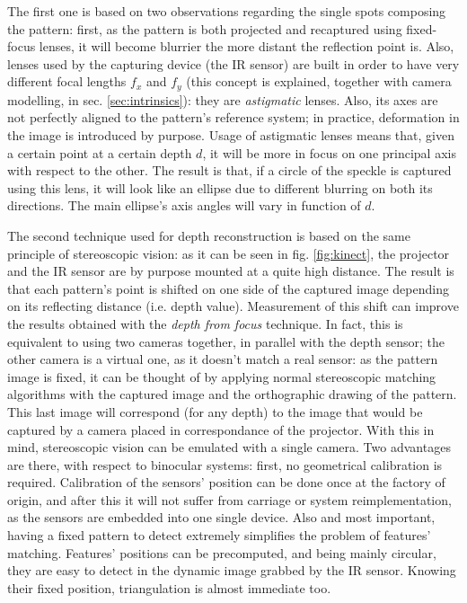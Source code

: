 The first one is based on two observations regarding the single spots
composing the pattern: first, as the pattern is both projected
and recaptured using fixed-focus lenses, it will become blurrier the more
distant the reflection point is. Also, lenses used by the capturing device (the
IR sensor) are built in order to have very different focal lengths $f_x$ and
$f_y$ (this concept is explained, together with camera modelling, in sec.
\ref{sec:intrinsics}): they are \emph{astigmatic} lenses. Also, its axes are not
perfectly aligned to the pattern's reference system; in practice, deformation in
the image is introduced by purpose. Usage of astigmatic lenses means that, given
a certain point at a certain depth $d$, it will be more in focus on one principal
axis with respect to the other. The result is that, if a circle of the speckle
is captured using this lens, it will look like an ellipse due to different
blurring on both its directions. The main ellipse's axis angles will vary in function
of $d$.

The second technique used for depth reconstruction is based on the same
principle of stereoscopic vision: as it can be seen in fig.
\ref{fig:kinect}, the projector and the IR sensor are by purpose mounted
at a quite high distance. The result is that each pattern's point is shifted on
one side of the captured image depending on its reflecting distance (i.e. depth
value). Measurement of this shift can improve the results obtained with the
\emph{depth from focus} technique. In fact, this is equivalent to using two
cameras together, in parallel with the depth sensor; the other camera is a
virtual one, as it doesn't match a real sensor: as the pattern image is fixed,
it can be thought of by applying normal stereoscopic matching algorithms with
the captured image and the orthographic drawing of the pattern. This last image
will correspond (for any depth) to the image that would be captured by a camera
placed in correspondance of the projector. With this in mind, stereoscopic
vision can be emulated with a single camera. 
Two advantages are there, with respect to binocular systems: first, no
geometrical calibration is required. Calibration of the sensors' position can be
done once at the factory of origin, and after this it will not suffer from
carriage or system reimplementation, as the sensors are embedded into one single
device. Also and most important, having a fixed pattern to detect extremely
simplifies the problem of features' matching. Features' positions can be
precomputed, and being mainly circular, they are easy to detect in the dynamic
image grabbed by the IR sensor. Knowing their fixed position, triangulation is
almost immediate too.


